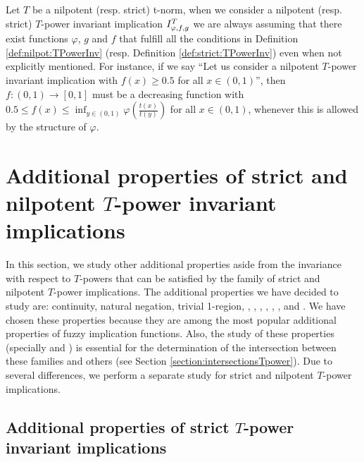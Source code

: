 \begin{remark}
	Let $T$ be a nilpotent (resp. strict) t-norm, when we consider a nilpotent (resp. strict) $T$-power invariant implication $I^T_{\varphi,f,g}$ we are always assuming that there exist functions $\varphi$, $g$ and $f$ that fulfill all the conditions in Definition \ref{def:nilpot:TPowerInv} (resp. Definition \ref{def:strict:TPowerInv}) even when not explicitly mentioned. For instance, if we say ``Let us consider \IT a nilpotent $T$-power invariant implication with $f(x)\geq 0.5$ for all $x \in (0,1)$'', then $f:(0,1) \to [0,1]$ must be a decreasing function with $0.5 \leq f(x) \leq \inf_{y \in (0,1)} \varphi \left(\frac{t(x)}{t(y)}\right)$ for all $x \in (0,1)$, whenever this is allowed by the structure of $\varphi$.
\end{remark}

\section{Additional properties of strict and nilpotent $T$-power invariant implications}\label{section:additional_propertiesTpower}

In this section, we study other additional properties aside from the invariance with respect to $T$-powers that can be satisfied by the family of strict and nilpotent $T$-power implications. The additional properties we have decided to study are: continuity, natural negation, trivial 1-region, \CB, \NP, \IP, \OP, \EP, \LI, \IB and \TC. We have chosen these properties because they are among the most popular additional properties of fuzzy implication functions. Also, the study of these properties (specially \NP and \EP) is essential for the determination of the intersection between these families and others (see Section \ref{section:intersectionsTpower}). Due to several differences, we perform a separate study for strict and nilpotent $T$-power implications.

\subsection{Additional properties of strict $T$-power invariant implications}\label{subsection:additional_propertiesStrictTpower}


